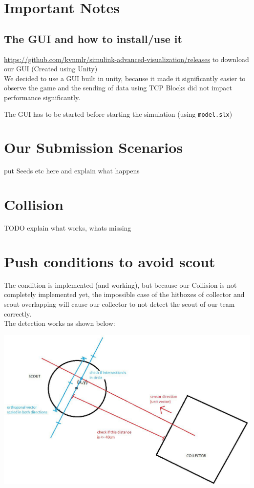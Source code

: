 \documentclass[12pt]{article}
\begin{document}
\lstset{language=C++}

\section*{Important Notes}

\subsection*{The GUI and how to install/use it}
\url{https://github.com/kvnmlr/simulink-advanced-visualization/releases}
to download our GUI (Created using Unity)\\

We decided to use a GUI built in unity, because it made it significantly easier to observe the game and the sending of data using TCP Blocks did not impact performance significantly.

The GUI has to be started before starting the simulation (using \verb!model.slx!)

\section*{Our Submission Scenarios}
put Seeds etc here and explain what happens

\section*{Collision}
TODO explain what works, whats missing

\section*{Push conditions to avoid scout}
The condition is implemented (and working), but because our Collision is not completely implemented yet, the impossible case of the hitboxes of collector and scout overlapping will cause our collector to not detect the scout of our team correctly.\\

The detection works as shown below:\\
\begin{center}
\includegraphics[scale = 0.4]{pictures/scout_condition}
\end{center}
\end{document}
